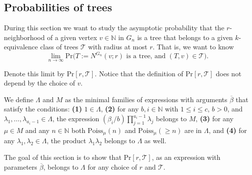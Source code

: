 \documentclass[12pt,notitlepage,a4paper]{article}
\theoremstyle{definition}
\newcommand{\N}{\mathbb{N}}
\newcommand{\Ln}{\lim\limits_{n\to \infty}}
\begin{document}
%	








\subsection{Probabilities of trees}

During this section we want to study
the asymptotic probability that the 
$r$-neighborhood of a given vertex $v\in \N$
in $G_n$ 
is a tree that belongs to a given $k$-equivalence
class of trees $\mathcal{T}$ with radius at most
$r$. That is, we want to know
\[\Ln \mathrm{Pr}\big( 
T:=N^{G_n}(v;r) \text{ is a tree, and } (T,v)\in \mathcal{T} \big). 
\]

Denote this limit by $\mathrm{Pr}[r,\mathcal{T}]$. Notice that the 
definition of  $\mathrm{Pr}[r,\mathcal{T}]$ does not depend by the
choice of $v$.\par

We define $\Lambda$ and $M$ as the minimal families
of expressions with arguments $\overline{\beta}$ that satisfy
 the conditions: \textbf{(1)} $1\in \Lambda$, \textbf{(2)} 
for any $b,i\in \N$ with $1\leq i \leq c$,
$b > 0$, and $\lambda_1,\dots, \lambda_{a_i-1}\in \Lambda$,
the expression $(\beta_i/b) \prod_{j=1}^{a_i-1}\lambda_j$
belongs to $M$,  \textbf{(3)}
for any $\mu\in M$ and any $n\in \N$ both
$\mathrm{Poiss}_{\mu}(n)$ and $\mathrm{Poiss}_\mu(\geq n)$ are in $\Lambda$, 
and  \textbf{(4)} for any $\lambda_1,\lambda_2 \in \Lambda$, the
product $\lambda_1\lambda_2$ belongs to $\Lambda$ as well.
\par
The goal of this section is to show 
that $\mathrm{Pr}[r,\mathcal{T}]$,
as an expression with parameters
$\overline{\beta}$, belongs to $\Lambda$ for any choice of 
$r$ and $\mathcal{T}$. \par
\end{document}
